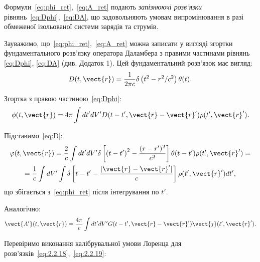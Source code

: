 Формули~\eqref{eq:phi_ret},~\eqref{eq:A_ret} подають \textit{запізнюючі розв’язки} рівнянь~\eqref{eq:Dphi},~\eqref{eq:DA}, що задовольняють умовам
випромінювання в разі
обмеженої
ізольованої системи зарядів та струмів.

Зауважимо, що~\eqref{eq:phi_ret},~\eqref{eq:A_ret} можна записати у вигляді згортки фундаментального розв’язку оператора Даламбера з правими частинами
рівнянь
\eqref{eq:Dphi},
\eqref{eq:DA} (див. Додаток 1). Цей фундаментальний розв’язок має вигляд:
\begin{equation}\label{eq:D}
	D(t, \vect{r}) = \frac{1}{2\pi c} \delta \left( t^2 - r^2 / c^2 \right) \theta(t).
\end{equation}

Згортка з правою частиною~\eqref{eq:Dphi}:
\begin{equation}\label{eq:2.2.18}
	\phi (t, \vect{r}) = 4\pi \int dt' dV' D(t - t', \vect{r} - \vect{r}') \rho (t', \vect{r}').
\end{equation}

Підставимо~\eqref{eq:D}:
\begin{multline*}
	\varphi (t, \vect{r}) = \frac{2}{c} \int dt' dV' \delta \left[ \left( t - t' \right)^2 - \frac{(r - r')^2}{c^2} \right] \theta (t - t') \rho (t',
	\vect{r}') = \\
	= \frac{1}{c} \int dV' \int \delta \left[ t - t' - \frac{|\vect{r} - \vect{r}'|}{c} \right] \rho (t', \vect{r}') dt',
\end{multline*}
що збігається з~\eqref{eq:phi_ret} після інтегрування по $t'$.

Аналогічно:
\begin{equation}\label{eq:2.2.19}
	\vect{A'} (t, \vect{r}) = \frac{4\pi}{c} \int dt' dV' G(t - t', \vect{r} - \vect{r}') \vect{j} (t', \vect{r}').
\end{equation}

Перевіримо виконання калібрувальної умови Лоренца для розв’язків~\eqref{eq:2.2.18},~\eqref{eq:2.2.19}:

